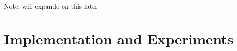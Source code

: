 Note: will expande on this later









































































































\section{Implementation and Experiments}





